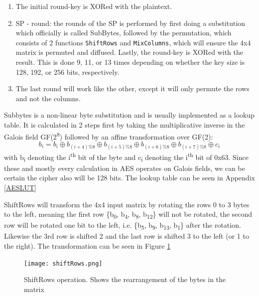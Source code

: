 \documentclass[a4paper, openany]{book}
\begin{document}
\begin{abstact}
\begin{enumerate}
\begin{center}
\end{center}

\item The initial round-key is XORed with the plaintext.
\item SP - round: the rounds of the SP is performed by first doing a substitution which officially is called SubBytes\cite{Rijndael}, followed by the permutation, which consists of 2 functions \texttt{ShiftRows} and \texttt{MixColumns}, which will ensure the 4x4 matrix is permuted and diffused. Lastly, the round-key is XORed with the result. This is done 9, 11, or 13 times depending on whether the key size is 128, 192, or 256 bits, respectively.
\item The last round will work like the other, except it will only permute the rows and not the columns.
\end{enumerate}

Subbytes is a non-linear byte substitution and is usually implemented as a lookup table. It is calculated in 2 steps first by taking the multiplicative inverse in the Galois field GF(2\textsuperscript{8}) followed by an affine transformation over GF(2):
\[b_i = b_i \oplus b_{(i+4) \% 8} \oplus b_{(i+5) \% 8} \oplus b_{(i+6) \% 8} \oplus b_{(i+7) \% 8} \oplus c_i \] with b\textsubscript{i} denoting the i\textsuperscript{th} bit of the byte and c\textsubscript{i} denoting the i\textsuperscript{th} bit of 0x63. Since these and mostly every calculation in AES operates on Galois fields, we can be certain the cipher also will be 128 bits. The lookup table can be seen in Appendix \ref{AESLUT}

ShiftRows will transform the 4x4 input matrix by rotating the rows 0 to 3 bytes to the left, meaning the first row \{b\textsubscript{0}, b\textsubscript{4}, b\textsubscript{8}, b\textsubscript{12}\} will not be rotated, the second row will be rotated one bit to the left, i.e. \{b\textsubscript{5}, b\textsubscript{9}, b\textsubscript{13}, b\textsubscript{1}\} after the rotation. Likewise the 3rd row is shifted 2 and the last row is shifted 3 to the left (or 1 to the right). The transformation can be seen in Figure \ref{fig:ShiftRows}


\begin{figure}[!htb]
\centering
\texttt{[image: shiftRows.png]}
\caption[ShiftRows operation]{ShiftRows operation. Shows the rearrangement of the bytes in the matrix}
\label{fig:ShiftRows}
\end{figure}


\end{abstact}
\end{document}
